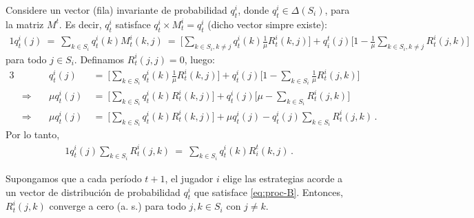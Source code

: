 Considere un vector (fila) invariante de probabilidad $q^i_t$, donde $q^i_t\in \Delta(S_i)$, para la matriz $M^t$. Es decir, $q^i_t$ satisface $q^i_t \times M^i_t = q^i_t$ (dicho vector simpre existe):
\begin{alignat}{1}
  q^i_t(j)\ 
    =\ \sum_{k\in S_i} q^i_t(k) M^i_t(k,j)\ 
    =\ \bigg[\sum_{k \in S_i, k \neq j} q^i_t(k)\frac{1}{\mu}R^i_t(k,j)\bigg] + q_i^t(j)\biggl[1 - \frac{1}{\mu}\sum_{k \in S_i, k \neq j} R^i_t(j,k)\biggr]
\end{alignat}
para todo $j \in S_i$. Definamos $R_t^i(j, j) = 0$, luego:
\begin{alignat}{3}
  &
  & q^i_t(j)\ &=\ \biggl[\sum_{k \in S_i} q^i_t(k)\frac{1}{\mu}R^i_t(k,j)\biggr] + q^i_t(j)\biggl[1 - \sum_{k \in S_i} \frac{1}{\mu} R^i_t(j,k)\biggr] \\
  &\Rightarrow\quad
  &\mu q_t^i(j)\ &=\ \biggl[\sum_{k \in S_i}q^i_t(k)R^i_t(k,j)\biggr] + q^i_t(j)\biggl[\mu - \sum_{k \in S_i} R^i_t(j, k)\biggr] \\
  &\Rightarrow\quad
  &\mu q^i_t(j)\ & =\ \biggl[\sum_{k \in S_i}q^i_t(k)R^i_t(k,j)\biggr] + \mu q^i_t(j) - q^i_t(j)\sum_{k\in S_i} R^i_t(j,k) \,.
\end{alignat}
Por lo tanto,
\begin{alignat}{1}
\label{eq:proc-B}
q^i_t(j)\sum_{k \in S_i} R^i_t(j,k)\ =\ \sum_{k \in S_i} q_t^i(k)R_i^t(k,j) \,.
\end{alignat}

\begin{theorem}
Supongamos que a cada período $t+1$, el jugador $i$ elige las estrategias acorde a un vector de distribución de probabilidad $q_t^i$ que satisface \eqref{eq:proc-B}. Entonces, $R^i_t(j, k)$ converge a cero (a. s.) para todo $j, k \in S_i$ con $j \neq k$.
\end{theorem}

